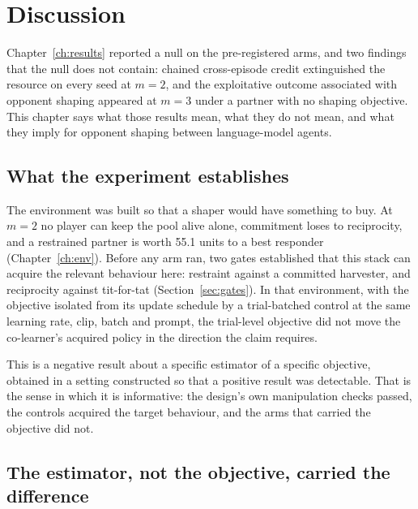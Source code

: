 \chapter{Discussion}
\label{ch:discussion}


Chapter~\ref{ch:results} reported a null on the pre-registered arms, and two
findings that the null does not contain: chained cross-episode credit
extinguished the resource on every seed at \(m=2\), and the exploitative
outcome associated with opponent shaping appeared at \(m=3\) under a partner
with no shaping objective.
This chapter says what those results mean, what they do not mean, and what
they imply for opponent shaping between language-model agents.

\section{What the experiment establishes}
\label{sec:disc-establishes}

The environment was built so that a shaper would have something to buy.
At \(m=2\) no player can keep the pool alive alone, commitment loses to
reciprocity, and a restrained partner is worth 55.1 units to a best
responder (Chapter~\ref{ch:env}).
Before any arm ran, two gates established that this stack can acquire the
relevant behaviour here: restraint against a committed harvester, and
reciprocity against tit-for-tat (Section~\ref{sec:gates}).
In that environment, with the objective isolated from its update schedule by
a trial-batched control at the same learning rate, clip, batch and prompt,
the trial-level objective did not move the co-learner's acquired policy in
the direction the claim requires.

This is a negative result about a specific estimator of a specific
objective, obtained in a setting constructed so that a positive result was
detectable.
That is the sense in which it is informative: the design's own manipulation
checks passed, the controls acquired the target behaviour, and the arms that
carried the objective did not.

\section{The estimator, not the objective, carried the difference}
\label{sec:disc-estimator}

